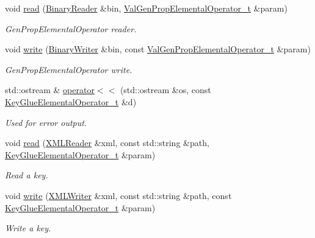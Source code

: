 \begin{DoxyCompactItemize}
void \mbox{\hyperlink{namespaceHadron_a26908582ef57fc950c0944a69dfcc275}{read}} (\mbox{\hyperlink{classADATIO_1_1BinaryReader}{Binary\+Reader}} \&bin, \mbox{\hyperlink{structHadron_1_1ValGenPropElementalOperator__t}{Val\+Gen\+Prop\+Elemental\+Operator\+\_\+t}} \&param)
\begin{DoxyCompactList}\small\item\em Gen\+Prop\+Elemental\+Operator reader. \end{DoxyCompactList}\item 
void \mbox{\hyperlink{namespaceHadron_a276bd4448f8f6233aa951856e912651e}{write}} (\mbox{\hyperlink{classADATIO_1_1BinaryWriter}{Binary\+Writer}} \&bin, const \mbox{\hyperlink{structHadron_1_1ValGenPropElementalOperator__t}{Val\+Gen\+Prop\+Elemental\+Operator\+\_\+t}} \&param)
\begin{DoxyCompactList}\small\item\em Gen\+Prop\+Elemental\+Operator write. \end{DoxyCompactList}\item 
std\+::ostream \& \mbox{\hyperlink{namespaceHadron_a04ae91286afb27f277e2c61cd6a77b8a}{operator$<$$<$}} (std\+::ostream \&os, const \mbox{\hyperlink{structHadron_1_1KeyGlueElementalOperator__t}{Key\+Glue\+Elemental\+Operator\+\_\+t}} \&d)
\begin{DoxyCompactList}\small\item\em Used for error output. \end{DoxyCompactList}\item 
void \mbox{\hyperlink{namespaceHadron_a0651834c5f37836ea0e1e081b4214546}{read}} (\mbox{\hyperlink{classADATXML_1_1XMLReader}{X\+M\+L\+Reader}} \&xml, const std\+::string \&path, \mbox{\hyperlink{structHadron_1_1KeyGlueElementalOperator__t}{Key\+Glue\+Elemental\+Operator\+\_\+t}} \&param)
\begin{DoxyCompactList}\small\item\em Read a key. \end{DoxyCompactList}\item 
void \mbox{\hyperlink{namespaceHadron_a4ae7852bf18d56cb1a966ce318245ea6}{write}} (\mbox{\hyperlink{classADATXML_1_1XMLWriter}{X\+M\+L\+Writer}} \&xml, const std\+::string \&path, const \mbox{\hyperlink{structHadron_1_1KeyGlueElementalOperator__t}{Key\+Glue\+Elemental\+Operator\+\_\+t}} \&param)
\begin{DoxyCompactList}\small\item\em Write a key. \end{DoxyCompactList}\item 

\end{DoxyCompactItemize}
